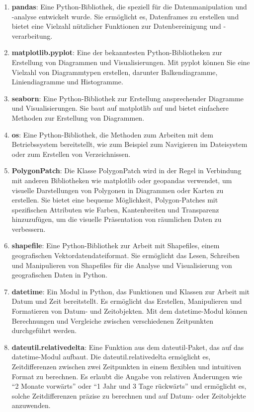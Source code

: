 \documentclass[11pt]{article}
\begin{document}
\begin{enumerate}
\def\labelenumi{\arabic{enumi}.}
\item
  \textbf{pandas}: Eine Python-Bibliothek, die speziell für die
  Datenmanipulation und -analyse entwickelt wurde. Sie ermöglicht es,
  Datenframes zu erstellen und bietet eine Vielzahl nützlicher
  Funktionen zur Datenbereinigung und -verarbeitung.
\item
  \textbf{matplotlib.pyplot}: Eine der bekanntesten Python-Bibliotheken
  zur Erstellung von Diagrammen und Visualisierungen. Mit pyplot können
  Sie eine Vielzahl von Diagrammtypen erstellen, darunter
  Balkendiagramme, Liniendiagramme und Histogramme.
\item
  \textbf{seaborn}: Eine Python-Bibliothek zur Erstellung ansprechender
  Diagramme und Visualisierungen. Sie baut auf matplotlib auf und bietet
  einfachere Methoden zur Erstellung von Diagrammen.
\item
  \textbf{os}: Eine Python-Bibliothek, die Methoden zum Arbeiten mit dem
  Betriebssystem bereitstellt, wie zum Beispiel zum Navigieren im
  Dateisystem oder zum Erstellen von Verzeichnissen.
\item
  \textbf{PolygonPatch}: Die Klasse PolygonPatch wird in der Regel in
  Verbindung mit anderen Bibliotheken wie matplotlib oder geopandas
  verwendet, um visuelle Darstellungen von Polygonen in Diagrammen oder
  Karten zu erstellen. Sie bietet eine bequeme Möglichkeit,
  Polygon-Patches mit spezifischen Attributen wie Farben, Kantenbreiten
  und Transparenz hinzuzufügen, um die visuelle Präsentation von
  räumlichen Daten zu verbessern.
\item
  \textbf{shapefile}: Eine Python-Bibliothek zur Arbeit mit Shapefiles,
  einem geografischen Vektordatendateiformat. Sie ermöglicht das Lesen,
  Schreiben und Manipulieren von Shapefiles für die Analyse und
  Visualisierung von geografischen Daten in Python.
\item
  \textbf{datetime}: Ein Modul in Python, das Funktionen und Klassen zur
  Arbeit mit Datum und Zeit bereitstellt. Es ermöglicht das Erstellen,
  Manipulieren und Formatieren von Datum- und Zeitobjekten. Mit dem
  datetime-Modul können Berechnungen und Vergleiche zwischen
  verschiedenen Zeitpunkten durchgeführt werden.
\item
  \textbf{dateutil.relativedelta}: Eine Funktion aus dem dateutil-Paket,
  das auf das datetime-Modul aufbaut. Die dateutil.relativedelta
  ermöglicht es, Zeitdifferenzen zwischen zwei Zeitpunkten in einem
  flexiblen und intuitiven Format zu berechnen. Es erlaubt die Angabe
  von relativen Änderungen wie ``2 Monate vorwärts'' oder ``1 Jahr und 3
  Tage rückwärts'' und ermöglicht es, solche Zeitdifferenzen präzise zu
  berechnen und auf Datum- oder Zeitobjekte anzuwenden.
\end{enumerate}
\end{document}

